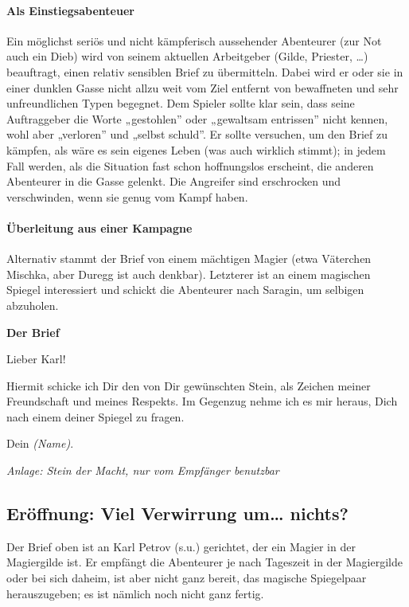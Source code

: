 \documentclass[a4paper,10pt]{scrartcl}
\begin{document}
\paragraph{Als Einstiegsabenteuer}
Ein möglichst seriös und nicht kämpferisch aussehender Abenteurer (zur
Not auch ein Dieb) wird von seinem aktuellen Arbeitgeber (Gilde,
Priester, …) beauftragt, einen relativ sensiblen Brief zu übermitteln.
Dabei wird er oder sie in einer dunklen Gasse nicht allzu weit vom Ziel
entfernt von bewaffneten und sehr unfreundlichen Typen begegnet. Dem
Spieler sollte klar sein, dass seine Auftraggeber die Worte „gestohlen”
oder „gewaltsam entrissen” nicht kennen, wohl aber „verloren” und
„selbst schuld”. Er sollte versuchen, um den Brief zu kämpfen, als wäre
es sein eigenes Leben (was auch wirklich stimmt); in jedem Fall werden,
als die Situation fast schon hoffnungslos erscheint, die anderen
Abenteurer in die Gasse gelenkt. Die Angreifer sind erschrocken und
verschwinden, wenn sie genug vom Kampf haben.

\paragraph{Überleitung aus einer Kampagne}
Alternativ stammt der Brief von einem mächtigen Magier (etwa Väterchen
Mischka, aber Duregg ist auch denkbar). Letzterer ist an einem magischen
Spiegel interessiert und schickt die Abenteurer nach Saragin, um
selbigen abzuholen.

\begin{textbox}
  {\bf Der Brief}

  Lieber Karl!

  Hiermit schicke ich Dir den von Dir gewünschten Stein, als Zeichen
  meiner Freundschaft und meines Respekts. Im Gegenzug nehme ich es mir
  heraus, Dich nach einem deiner Spiegel zu fragen.

  Dein \emph{(Name)}.

  \emph{Anlage: Stein der Macht, nur vom Empfänger benutzbar}
\end{textbox}

\subsection{Eröffnung: Viel Verwirrung um… nichts?}

Der Brief oben ist an Karl Petrov (s.u.) gerichtet, der ein Magier in
der Magiergilde ist. Er empfängt die Abenteurer je nach Tageszeit in der
Magiergilde oder bei sich daheim, ist aber nicht ganz bereit, das
magische Spiegelpaar herauszugeben; es ist nämlich noch nicht ganz
fertig.
\end{document}
